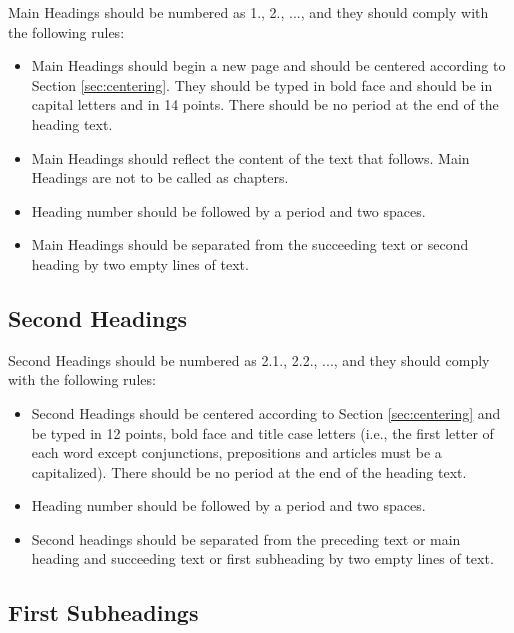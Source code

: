 \documentclass[a4paper,oneside,12pt]{report}
\numberwithin{equation}{chapter}
\begin{document}
Main Headings should be numbered as 1., 2., ..., and they should comply with the following rules:
\begin{itemize}
 \item Main Headings should begin a new page and should be centered according to
Section \ref{sec:centering}. They should be typed in bold face and should be in capital letters and in
14 points. There should be no period at the end of the heading text.
\item Main Headings should reflect the content of the text that follows.
Main Headings are not to be called as chapters.
\item Heading number should be followed by a period and two spaces.
\item Main Headings should be separated from the succeeding text or second heading by two empty lines of text.
\end{itemize}

\begin{figure}
    \begin{subfigure}
        
    \end{subfigure}
\end{figure}


\subsection{Second Headings}

Second Headings should be numbered as 2.1., 2.2., ..., and they should comply with the following rules:
\begin{itemize}
 \item Second Headings should be centered according to Section \ref{sec:centering} and be typed in 12 points, bold face and title case letters (i.e., the first letter of each word except conjunctions, prepositions and articles must be a capitalized). There should be no period at the end of the heading text.
\item Heading number should be followed by a period and two spaces.
\item Second headings should be separated from the preceding text or main heading and succeeding text or first subheading by two empty lines of text.
\end{itemize}


\subsection{First Subheadings}
\end{document}
